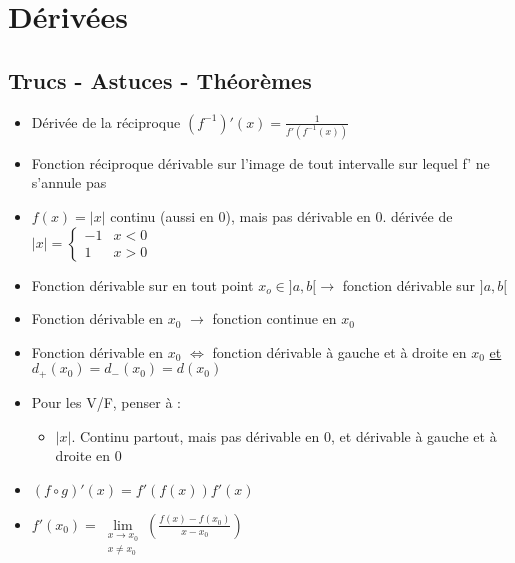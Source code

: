 \documentclass[12pt,a4paper]{article}
\newcommand{\llimite}[3]{\limite{\substack{#1 \\ #2}}\left(#3\right)}
\newcommand{\limite}{\lim\limits_}
\newcommand{\Xo}{\ensuremath{x_0} }
\begin{document}
\section{Dérivées}
\subsection{Trucs - Astuces - Théorèmes}
\begin{itemize}
	\item Dérivée de la réciproque $(f^{-1})'(x) = \frac{1}{f'(f^{-1}(x))}$
	\item Fonction réciproque dérivable sur l'image de tout intervalle sur lequel f' ne s'annule pas
	\item $f(x) = |x|$ continu (aussi en 0), mais pas dérivable en 0. dérivée de $|x| = \left\{
	\begin{array}{ll}
	-1 & x < 0\\
	1 & x > 0
	\end{array}\right.$
	\item Fonction dérivable sur en tout point $x_o \in ]a,b[ \to$ fonction dérivable sur $]a,b[$
	\item Fonction dérivable en \Xo$\to$ fonction continue en $x_0$
	\item Fonction dérivable en \Xo $\iff$ fonction dérivable à gauche et à droite en \Xo  \underline{et} $d_+(\Xo) = d_-(\Xo) = d(\Xo)$
	\item Pour les V/F, penser à :
	\begin{itemize}
		\item $|x|$. Continu partout, mais pas dérivable en 0, et dérivable à gauche et à droite en 0
	\end{itemize}
	\item $(f\circ g)'(x) = f'(f(x)) f'(x)$
	\item $f'(\Xo) = \llimite{x\to \Xo}{x \neq \Xo}{\frac{f(x) - f(\Xo)}{x-\Xo}}$	
\end{itemize}
\end{document}
